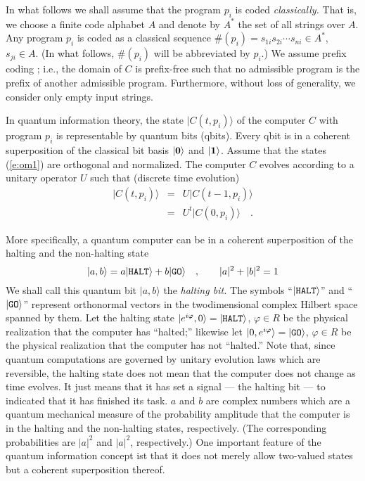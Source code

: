 In what follows we shall assume that the program $p_i$ is
coded {\em classically.} That is, we choose a finite code alphabet $A$
and denote by $A^\ast$ the set of all strings over $A$.
Any program $p_i$ is coded as a classical sequence
$\#(p_i)=s_{1i}s_{2i}\cdots s_{ni}\in A^\ast $, $s_{ji}\in A$.
(In what follows, $\# (p_i)$ will be abbreviated by $p_i$.)
We assume prefix coding
\cite{hamming,chaitin,svozil,calude}; i.e., the domain of $C$ is
prefix-free such that no admissible program is the prefix of another
admissible program.
Furthermore, without loss of generality, we consider only empty input
strings.

In quantum information theory, the state
$\vert C(t, p_i)\rangle $
of the computer $C$ with
program $p_i$ is
representable by quantum bits
(qbits).
Every qbit is in a coherent superposition of the classical bit basis
$\vert  {\bf 0} \rangle $ and
$\vert  {\bf 1} \rangle $.
 Assume that
 the states
(\ref{e:om1})
are  orthogonal and
 normalized.
 The computer $C$ evolves according to a unitary
operator
$U$  such that
 (discrete time evolution)
 \begin{eqnarray}
 \vert C(t,p_i) \rangle &=&U\vert C(t-1, p_i)\rangle \\
&=&U^t\vert C(0,p_i)\rangle
 \quad
 . \end{eqnarray}

More specifically,
a quantum computer can be in a coherent superposition of the
halting and the non-halting state
\cite{deutsch-85,sv:94}
 \begin{equation}
\vert a,b\rangle  =a\vert {\tt HALT}\rangle
 +b\vert {\tt GO}\rangle \quad ,\qquad \vert a\vert^2 +\vert b\vert^2=1
 \end{equation}
We shall call this quantum bit $\vert a,b\rangle$ the {\em halting bit.}
The symbols
``$\vert {\tt HALT}\rangle $''
and
``$\vert {\tt GO}\rangle $''
represent orthonormal vectors \cite{orthon}
 in the twodimensional complex
Hilbert space spanned by them.
Let the halting state $\vert e^{i\varphi },0\rangle =\vert {\tt
HALT}\rangle
$, $\varphi \in R$ be the physical realization that the computer has
``halted;''
likewise let
$\vert 0,e^{i\varphi }\rangle =\vert {\tt GO}\rangle$,
$\varphi \in R$ be the physical realization that the computer has not
``halted.''
Note that, since quantum computations are governed by unitary evolution
laws which are reversible, the halting state does not mean that the
computer does not change as time evolves. It just means that it has set
a signal --- the halting bit --- to indicated that it has finished its
task.
$a$ and $b$ are complex numbers which are a quantum mechanical measure
of the probability amplitude that the computer is in the halting and the
non-halting states, respectively.
(The corresponding probabilities are $\vert a\vert^2$
and $\vert a\vert^2$, respectively.)
One
important feature of the quantum information concept ist that it does
not
merely allow two-valued states but a coherent superposition thereof.

